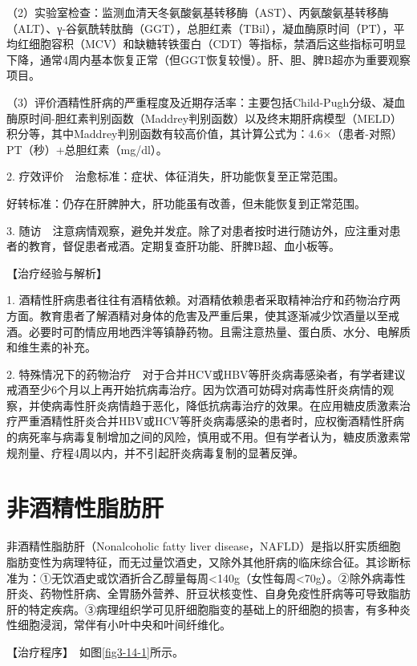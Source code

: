 （2）实验室检查：监测血清天冬氨酸氨基转移酶（AST）、丙氨酸氨基转移酶（ALT）、γ-谷氨酰转肽酶（GGT），总胆红素（TBil），凝血酶原时间（PT），平均红细胞容积（MCV）和缺糖转铁蛋白（CDT）等指标，禁酒后这些指标可明显下降，通常4周内基本恢复正常（但GGT恢复较慢）。肝、胆、脾B超亦为重要观察项目。

（3）评价酒精性肝病的严重程度及近期存活率：主要包括Child-Pugh分级、凝血酶原时间-胆红素判别函数（Maddrey判别函数）以及终末期肝病模型（MELD）积分等，其中Maddrey判别函数有较高价值，其计算公式为：4.6×（患者-对照）PT（秒）+总胆红素（mg/dl）。

2. 疗效评价　治愈标准：症状、体征消失，肝功能恢复至正常范围。

好转标准：仍存在肝脾肿大，肝功能虽有改善，但未能恢复到正常范围。

3.
随访　注意病情观察，避免并发症。除了对患者按时进行随访外，应注重对患者的教育，督促患者戒酒。定期复查肝功能、肝脾B超、血小板等。

【治疗经验与解析】

1.
酒精性肝病患者往往有酒精依赖。对酒精依赖患者采取精神治疗和药物治疗两方面。教育患者了解酒精对身体的危害及严重后果，使其逐渐减少饮酒量以至戒酒。必要时可酌情应用地西泮等镇静药物。且需注意热量、蛋白质、水分、电解质和维生素的补充。

2.
特殊情况下的药物治疗　对于合并HCV或HBV等肝炎病毒感染者，有学者建议戒酒至少6个月以上再开始抗病毒治疗。因为饮酒可妨碍对病毒性肝炎病情的观察，并使病毒性肝炎病情趋于恶化，降低抗病毒治疗的效果。在应用糖皮质激素治疗严重酒精性肝炎合并HBV或HCV等肝炎病毒感染的患者时，应权衡酒精性肝病的病死率与病毒复制增加之间的风险，慎用或不用。但有学者认为，糖皮质激素常规剂量、疗程4周以内，并不引起肝炎病毒复制的显著反弹。

\section{非酒精性脂肪肝}

非酒精性脂肪肝（Nonalcoholic fatty liver
disease，NAFLD）是指以肝实质细胞脂肪变性为病理特征，而无过量饮酒史，又除外其他肝病的临床综合征。其诊断标准为：①无饮酒史或饮酒折合乙醇量每周\textless{}140g（女性每周\textless{}70g）。②除外病毒性肝炎、药物性肝病、全胃肠外营养、肝豆状核变性、自身免疫性肝病等可导致脂肪肝的特定疾病。③病理组织学可见肝细胞脂变的基础上的肝细胞的损害，有多种炎性细胞浸润，常伴有小叶中央和叶间纤维化。

【治疗程序】　如图\ref{fig3-14-1}所示。

